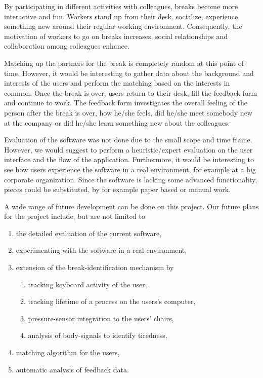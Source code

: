 By participating in different activities with colleagues, breaks become more interactive and fun. Workers stand up from their desk, socialize, experience something new around their regular working environment. Consequently, the motivation of workers to go on breaks increases, social relationships and collaboration among colleagues enhance. 

Matching up the partners for the break is completely random at this point of time. However, it would be interesting to gather data about the background and interests of the users and perform the matching based on the interests in common. Once the break is over, users return to their desk, fill the feedback form and continue to work. The feedback form investigates the overall feeling of the person after the break is over, how he/she feels, did he/she meet somebody new at the company or did he/she learn something new about the colleagues. 

Evaluation of the software was not done due to the small scope and time frame. However, we would suggest to perform a heuristic/expert evaluation on the user interface and the flow of the application. Furthermore, it would be interesting to see how users experience the software in a real environment, for example at a big corporate organization. Since the software is lacking some advanced functionality, pieces could be substituted, by for example paper based or manual work. 

A wide range of future development can be done on this project. Our future plans for the project include, but are not limited to 
\begin{enumerate}
	\item the detailed evaluation of the current software,
	\item experimenting with the software in a real environment,
	\item extension of the break-identification mechanism by
		\begin{enumerate}
			\item tracking keyboard activity of the user,
			\item tracking lifetime of a process on the users's computer,
			\item pressure-sensor integration to the users' chairs,
			\item analysis of body-signals to identify tiredness,
		\end{enumerate}
	\item matching algorithm for the users,
	\item automatic analysis of feedback data.
\end{enumerate}